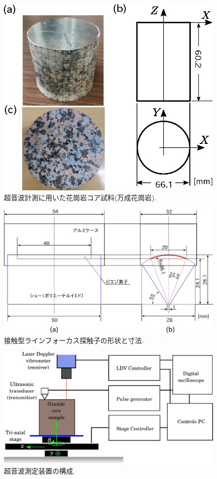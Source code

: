 \begin{figure}[h]
	\begin{center}
	\includegraphics[width=0.6\linewidth]{Figs/fig1.eps} 
	\end{center}
	\caption{
		超音波計測に用いた花崗岩コア試料(万成花崗岩).
	} 
	\label{fig:fig1}
\end{figure}
\begin{figure}[h]
	\begin{center}
	\includegraphics[width=0.8\linewidth]{Figs/fig2.eps} 
	\end{center}
	\caption{
		接触型ラインフォーカス探触子の形状と寸法.
	} 
	\label{fig:fig2}
\end{figure}
\begin{figure}[h]
	\begin{center}
	\includegraphics[width=0.8\linewidth]{Figs/fig3.eps} 
	\end{center}
	\caption{
		超音波測定装置の構成.
	} 
	\label{fig:fig3}
\end{figure}
